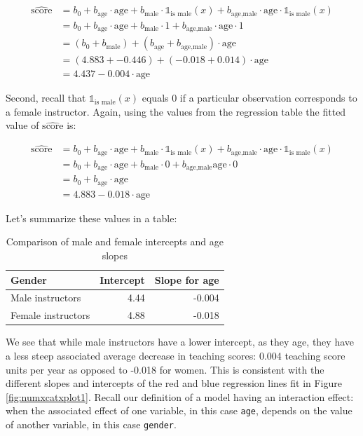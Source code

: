 \documentclass[12pt,]{krantz}
\theoremstyle{definition}
\theoremstyle{definition}
\theoremstyle{definition}
\theoremstyle{remark}
\begin{document}
\begin{align}
\widehat{\mbox{score}} &= b_0 + b_{\mbox{age}} \cdot \mbox{age} + b_{\mbox{male}} \cdot \mathbb{1}_{\mbox{is male}}(x) + b_{\mbox{age,male}} \cdot \mbox{age} \cdot \mathbb{1}_{\mbox{is male}}(x) \\
&= b_0 + b_{\mbox{age}} \cdot \mbox{age} + b_{\mbox{male}} \cdot 1 + b_{\mbox{age,male}} \cdot \mbox{age} \cdot 1 \\
&= \left(b_0 + b_{\mbox{male}}\right) + \left(b_{\mbox{age}} +  b_{\mbox{age,male}} \right) \cdot \mbox{age} \\
&= \left(4.883 + -0.446\right) + \left(-0.018 +  0.014 \right) \cdot \mbox{age} \\
&= 4.437 -0.004 \cdot \mbox{age}
\end{align}

Second, recall that \(\mathbb{1}_{\mbox{is male}}(x)\) equals 0 if a
particular observation corresponds to a female instructor. Again, using
the values from the regression table the fitted value of
\(\widehat{\mbox{score}}\) is:

\begin{align}
\widehat{\mbox{score}} &= b_0 + b_{\mbox{age}} \cdot \mbox{age} + b_{\mbox{male}} \cdot \mathbb{1}_{\mbox{is male}}(x) + b_{\mbox{age,male}} \cdot \mbox{age} \cdot \mathbb{1}_{\mbox{is male}}(x) \\
&= b_0 + b_{\mbox{age}} \cdot \mbox{age} + b_{\mbox{male}} \cdot 0 + b_{\mbox{age,male}}\mbox{age} \cdot 0 \\
&= b_0 + b_{\mbox{age}} \cdot \mbox{age}\\
&= 4.883 -0.018 \cdot \mbox{age}
\end{align}

Let's summarize these values in a table:

\begin{table}[H]

\caption{\label{tab:unnamed-chunk-249}Comparison of male and female intercepts and age slopes}
\centering
\fontsize{10}{12}\selectfont
\begin{tabular}[t]{lrr}
\toprule
Gender & Intercept & Slope for age\\
\midrule
Male instructors & 4.44 & -0.004\\
Female instructors & 4.88 & -0.018\\
\bottomrule
\end{tabular}
\end{table}

We see that while male instructors have a lower intercept, as they age,
they have a less steep associated average decrease in teaching scores:
0.004 teaching score units per year as opposed to -0.018 for women. This
is consistent with the different slopes and intercepts of the red and
blue regression lines fit in Figure \ref{fig:numxcatxplot1}. Recall our
definition of a model having an interaction effect: when the associated
effect of one variable, in this case \texttt{age}, depends on the value
of another variable, in this case \texttt{gender}.
\end{document}
